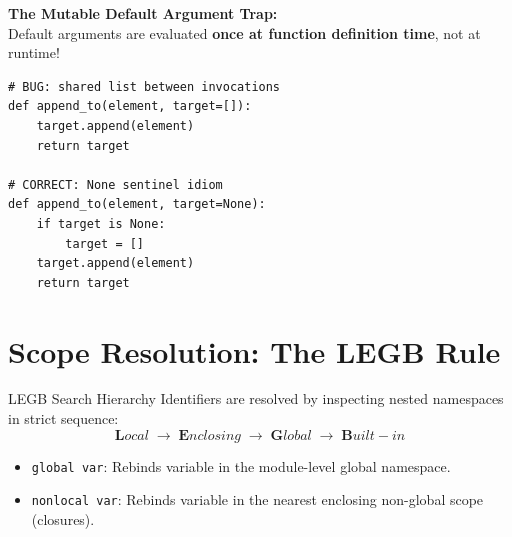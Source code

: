 \begin{memorytip}
\textbf{The Mutable Default Argument Trap:}\\
Default arguments are evaluated \textbf{once at function definition time}, not at runtime!
\begin{lstlisting}
# BUG: shared list between invocations
def append_to(element, target=[]):
    target.append(element)
    return target

# CORRECT: None sentinel idiom
def append_to(element, target=None):
    if target is None:
        target = []
    target.append(element)
    return target
\end{lstlisting}
\end{memorytip}

\section{Scope Resolution: The LEGB Rule}
\begin{formulabox}{LEGB Search Hierarchy}
Identifiers are resolved by inspecting nested namespaces in strict sequence:
\begin{equation}
\textbf{L}ocal \;\longrightarrow\; \textbf{E}nclosing \;\longrightarrow\; \textbf{G}lobal \;\longrightarrow\; \textbf{B}uilt-in
\end{equation}
\begin{itemize}[leftmargin=1.5em, itemsep=2pt]
    \item \texttt{global var}: Rebinds variable in the module-level global namespace.
    \item \texttt{nonlocal var}: Rebinds variable in the nearest enclosing non-global scope (closures).
\end{itemize}
\end{formulabox}

